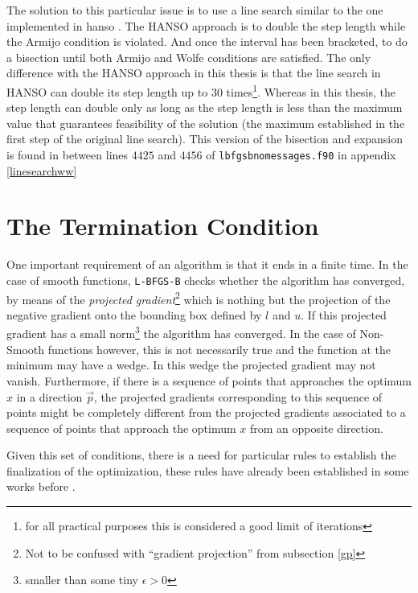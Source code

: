 The solution to this particular issue is to use a line search similar to the one implemented in hanso \citep{hanso}. The HANSO approach is to double the step length while the Armijo condition is violated. And once the interval has been bracketed, to do a bisection until both Armijo and Wolfe conditions are satisfied. The only difference with the HANSO approach in this thesis is that the line search in HANSO can double its step length up to $30$ times\footnote{for all practical purposes this is considered a good limit of iterations}. Whereas in this thesis, the step length can double only as long as the step length is less than the maximum value that guarantees feasibility of the solution (the maximum established in the first step of the original line search). This version of the bisection and expansion is found in between lines $4425$ and $4456$ of \texttt{lbfgsbnomessages.f90} in appendix \eqref{linesearchww} 

\section{The Termination Condition} \label{terminator}

One important requirement of an algorithm is that it ends in a finite time. In the case of smooth functions, \texttt{L-BFGS-B} checks whether the algorithm has converged, by means of the \emph{projected gradient}\footnote{Not to be confused with ``gradient projection'' from subsection \eqref{gp}} which is nothing but the projection of the negative gradient onto the bounding box defined by $l$ and $u$. If this projected gradient has a small norm\footnote{smaller than some tiny $\epsilon > 0$} the algorithm has converged. In the case of Non-Smooth functions however, this is not necessarily true and the function at the minimum may have a wedge. In this wedge the projected gradient may not vanish. Furthermore, if there is a sequence of points that approaches the optimum $x$ in a direction $\vec{p}$, the projected gradients corresponding to this sequence of points might be completely different from the projected gradients associated to a sequence of points that approach the optimum $x$ from an opposite direction.

Given this set of conditions, there is a need for particular rules to establish the finalization of the optimization, these rules have already been established in some works before \citep{overtonlewis, skajaa}.

